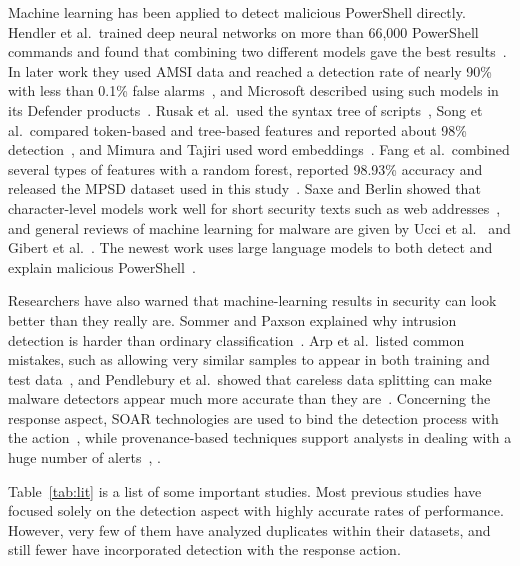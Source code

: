 \documentclass[12pt,a4paper]{article}
\begin{document}
Machine learning has been applied to detect malicious PowerShell directly. Hendler et al.\ trained deep neural networks on more than 66,000 PowerShell commands and found that combining two different models gave the best results~\cite{hendler2018}. In later work they used AMSI data and reached a detection rate of nearly 90\% with less than 0.1\% false alarms~\cite{hendler2020}, and Microsoft described using such models in its Defender products~\cite{ms_blog2019}. Rusak et al.\ used the syntax tree of scripts~\cite{rusak2018}, Song et al.\ compared token-based and tree-based features and reported about 98\% detection~\cite{song2021}, and Mimura and Tajiri used word embeddings~\cite{mimura2021}. Fang et al.\ combined several types of features with a random forest, reported 98.93\% accuracy and released the MPSD dataset used in this study~\cite{fang2021}. Saxe and Berlin showed that character-level models work well for short security texts such as web addresses~\cite{saxe2017}, and general reviews of machine learning for malware are given by Ucci et al.~\cite{ucci2019} and Gibert et al.~\cite{gibert2020}. The newest work uses large language models to both detect and explain malicious PowerShell~\cite{wang2026}.

Researchers have also warned that machine-learning results in security can look better than they really are. Sommer and Paxson explained why intrusion detection is harder than ordinary classification~\cite{sommer2010}. Arp et al.\ listed common mistakes, such as allowing very similar samples to appear in both training and test data~\cite{arp2022}, and Pendlebury et al.\ showed that careless data splitting can make malware detectors appear much more accurate than they are~\cite{pendlebury2019}. Concerning the response aspect, SOAR technologies are used to bind the detection process with the action~\cite{islam2019}, while provenance-based techniques support analysts in dealing with a huge number of alerts~\cite{hassan2019}, \cite{hassan2020}.

Table~\ref{tab:lit} is a list of some important studies. Most previous studies have focused solely on the detection aspect with highly accurate rates of performance. However, very few of them have analyzed duplicates within their datasets, and still fewer have incorporated detection with the response action.
\end{document}
